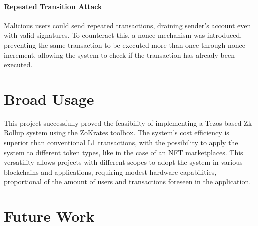 \paragraph{Repeated Transition Attack} Malicious users could send repeated transactions, draining sender's account even with valid signatures. To counteract this, a nonce mechanism was introduced, preventing the same transaction to be executed more than once through nonce increment, allowing the system to check if the transaction has already been executed.

\section{Broad Usage\label{sec:dissemination}}

This project successfully proved the feasibility of implementing a Tezos-based Zk-Rollup system using the ZoKrates toolbox. The system's cost efficiency is superior than conventional L1 transactions, with the possibility to apply the system to different token types, like in the case of an NFT marketplaces. This versatility allows projects with different scopes to adopt the system in various blockchains and applications, requiring modest hardware capabilities, proportional of the amount of users and transactions foreseen in the application.

\section{Future Work}

